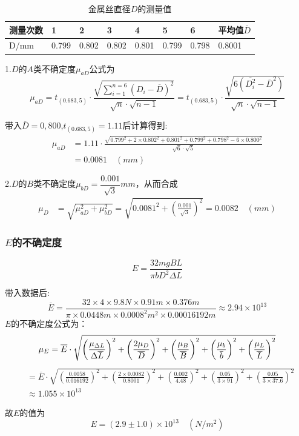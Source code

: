 \documentclass[UTF8]{article}
\begin{document}
\begin{table}[h]
	\centering
	\begin{tabular}{|l|l|l|l|l|l|l|l|}
	\hline
	测量次数 & 1     & 2     & 3     & 4     & 5     & 6     & 平均值$\overline{D}$      \\ \hline
	D/mm & 0.799 & 0.802 & 0.802 & 0.801 & 0.799 & 0.798 & 0.8001 \\ \hline
	\end{tabular}
\caption{金属丝直径$D$的测量值}
\end{table}
\par 1.$D$的$A$类不确定度$\mu_{aD}$公式为
\[ \mu_{aD}=t_{(0.683,5)}\cdot\frac{\sqrt{\sum_{i=1}^{n=6}(D_i-\overline{D})^2}}{\sqrt{n}\cdot\sqrt{n-1}}=t_{(0.683,5)}\cdot\frac{\sqrt{6(\overline{D_i^2}-\overline{D}^2)}}{\sqrt{n}\cdot\sqrt{n-1}}\]
\par 带入$\overline{D}=0,800$,\quad$t_{(0.683,5)}=1.11$后计算得到:
\begin{align*}
	\mu_{aD}&=1.11\cdot \frac{\sqrt{0.799^2+2\times0.802^2+0.801^2+0.799^2+0.798^2-6\times0.800^2}}{\sqrt{6}\cdot\sqrt{5}}\\
		&=0.0081\quad (mm)
\end{align*}
\par 2.$D$的$B$类不确定度$\mu_{bD}=\dfrac{0.001}{\sqrt{3}}mm$，从而合成
\begin{align*}
	\mu_D &= \sqrt{\mu_{aD}^2+\mu_{bD}^2} = \sqrt{0.0081^2+\left(\frac{0.001}{\sqrt{3}}\right)^2} = 0.0082 \quad (mm)
\end{align*}
\subsubsection*{$E$的不确定度}
\[E=\frac{32mgBL}{\pi bD^2\Delta L}\]
\par 带入数据后:
\clearpage
\[\overline{E} = \frac{32\times4\times9.8N\times0.91m\times0.376m}{\pi\times0.0448m\times0.0008^2m^2\times0.00016192m}\approx2.94\times10^{13}\]
$E$的不确定度公式为：
\[	\mu_E = \overline{E}\cdot\sqrt{\left(\frac{\mu_{\Delta L}}{\Delta \overline{L} }\right)^2+\left(\frac{2\mu_{D}}{\overline{D} }\right)^2+\left(\frac{\mu_{B }}{\overline{B} }\right)^2+\left(\frac{\mu_{b}}{\overline{b} }\right)^2+\left(\frac{\mu_{L}}{\overline{L} }\right)^2}\\\]
\begin{align*}
	&=\overline{E}\cdot\sqrt{\left(\frac{0.0058}{0.016192}\right)^2+\left(\frac{2\times0.0082}{0.8001}\right)^2+\left(\frac{0.002}{4.48}\right)^2+\left(\frac{0.05}{3\times91}\right)^2+\left(\frac{0.05}{3\times37.6}\right)^2}\\
	&\approx1.055\times10^{13}
\end{align*}
\par 故$E$的值为
\[E = (2.9\pm1.0)\times10^{13}\quad (N/m^2)\] 
\end{document}
